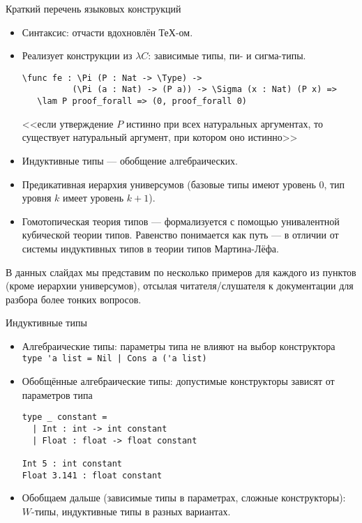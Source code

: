 \documentclass[aspectratio=169,dvipsnames,usenames]{beamer}
\begin{document}
\begin{frame}[fragile]{Краткий перечень языковых конструкций}
\begin{itemize}
\item Синтаксис: отчасти вдохновлён ТеХ-ом.
\item Реализует конструкции из $\lambda C$: зависимые типы, пи- и сигма-типы.
\small\color[HTML]{025002}
\begin{verbatim}
\func fe : \Pi (P : Nat -> \Type) -> 
          (\Pi (a : Nat) -> (P a)) -> \Sigma (x : Nat) (P x) =>
   \lam P proof_forall => (0, proof_forall 0)
\end{verbatim}
\normalsize\color{black}
<<если утверждение $P$ истинно при всех натуральных аргументах, то существует натуральный
аргумент, при котором оно истинно>>
\item Индуктивные типы --- обобщение алгебраических.
\item Предикативная иерархия универсумов (базовые типы имеют уровень 0, тип уровня $k$ имеет уровень $k+1$).
\item Гомотопическая теория типов --- формализуется с помощью унивалентной кубической теории типов.
Равенство понимается как путь --- в отличии от системы индуктивных типов в теории типов Мартина-Лёфа.
\end{itemize}
В данных слайдах мы представим по несколько примеров для каждого из пунктов (кроме иерархии универсумов),
отсылая читателя/слушателя к документации для разбора более тонких вопросов.
\end{frame}

\begin{frame}[fragile]{Индуктивные типы}
\begin{itemize}
\item Алгебраические типы: параметры типа не влияют на выбор конструктора
\small\color[HTML]{025002}
\verb!type 'a list = Nil | Cons a ('a list)!
\normalsize
\color{black}

\item Обобщённые алгебраические типы: допустимые конструкторы зависят от параметров типа
\small\color[HTML]{025002}\begin{verbatim}
type _ constant =
  | Int : int -> int constant
  | Float : float -> float constant

Int 5 : int constant
Float 3.141 : float constant
\end{verbatim}\normalsize 
\color{black}

\item Обобщаем дальше (зависимые типы в параметрах, сложные конструкторы): $W$-типы, индуктивные типы в разных вариантах.
\end{itemize}
\end{frame}
\end{document}
